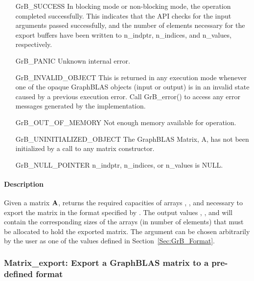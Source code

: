 \begin{itemize}[leftmargin=2.3in]
    \item[{\sf GrB\_SUCCESS}]   In blocking mode or non-blocking mode, the
    operation completed successfully. This indicates that the API checks 
    for the input arguments passed successfully, and the number of elements necessary
    for the export buffers have been written to {\sf n\_indptr}, {\sf n\_indices},
    and {\sf n\_values}, respectively.

    \item[{\sf GrB\_PANIC}]     Unknown internal error.
    
    \item[{\sf GrB\_INVALID\_OBJECT}] This is returned in any execution mode 
    whenever one of the opaque GraphBLAS objects (input or output) is in an invalid 
    state caused by a previous execution error.  Call {\sf GrB\_error()} to access 
    any error messages generated by the implementation.

    \item[{\sf GrB\_OUT\_OF\_MEMORY}] Not enough memory available for operation.
    
    \item[{\sf GrB\_UNINITIALIZED\_OBJECT}]  The GraphBLAS Matrix, {\sf A}, has 
    not been initialized by a call to any matrix constructor.

    \item[{\sf GrB\_NULL\_POINTER}]  {\sf n\_indptr}, 
    {\sf n\_indices}, or {\sf n\_values} is {\sf NULL}.
\end{itemize}

\paragraph{Description}

Given a matrix ${\bf A}$, returns the required capacities of arrays ,
, and  necessary to export the matrix in the format specified by .
The output values , , and  will
contain the corresponding sizes of the arrays (in number of elements) that must be allocated to hold
the exported matrix.  The argument  can be chosen arbitrarily by the
user as one of the values defined in Section~\ref{Sec:GrB_Format}.


\subsubsection{{\sf Matrix\_export}: Export a GraphBLAS matrix to a pre-defined format }
\label{Sec:Matrix_export}

